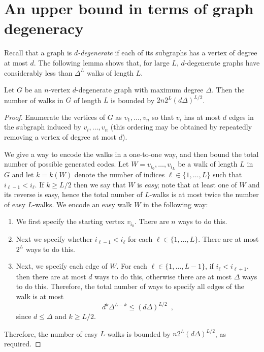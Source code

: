 \documentclass{patmorin}
\begin{document}
\section{An upper bound in terms of graph degeneracy}
Recall that a graph is \emph{$d$-degenerate} if each of its subgraphs has a vertex of  degree at most $d$.  The following lemma shows that, for large $L$, $d$-degenerate graphs have considerably less than $\Delta^L$ walks of length $L$.

\begin{lem}
   Let $G$ be an $n$-vertex $d$-degenerate graph with maximum degree
   $\Delta$.  Then the number of walks in $G$ of length $L$ is bounded by    $2n2^{L}(d\Delta)^{L/2}$.  
\end{lem}

\begin{proof}
   Enumerate the vertices of $G$ as $v_1,\ldots,v_n$ so that $v_i$ has at most
   $d$ edges in the subgraph induced by $v_i,\ldots,v_n$ (this ordering may be obtained by repeatedly removing a vertex of degree at most $d$).

   We give a way to encode the walks in a one-to-one way, and then bound the total number of possible generated codes.
   Let $W=v_{i_0},\ldots,v_{i_L}$
   be a walk of length $L$ in $G$ and let $k=k(W)$ denote the number
   of indices $\ell\in\{1,\ldots,L\}$ such that $i_{\ell-1} < i_{\ell}$.
   If $k\ge L/2$ then we say that $W$ is \emph{easy};
   note that at least one of $W$ and its reverse is easy, hence the total number of $L$-walks is at most twice the number of easy $L$-walks. We  encode an easy walk $W$ in the following way:
   \begin{enumerate}
     \item We first specify the starting vertex $v_{i_0}$.  There are $n$
       ways to do this.
     \item Next we specify whether $i_{\ell-1} < i_{\ell}$ for each
       $\ell\in\{1,\ldots,L\}$.  There are at most  $2^L$ ways to do this.
     \item Next, we specify each edge of $W$.  For each
       $\ell\in\{1,\ldots,L-1\}$, if $i_{\ell} < i_{\ell+1}$, then
       there are at most $d$ ways to do this, otherwise there are at
       most $\Delta$ ways to do this.
       Therefore, the total number of ways to specify all edges of the
       walk is at most
       \[   d^k\Delta^{L-k} \le (d\Delta)^{L/2}  \enspace ,\]
       since $d\le \Delta$ and $k\ge L/2$.
   \end{enumerate}
   Therefore, the number of easy $L$-walks is bounded by $n2^L(d\Delta)^{L/2}$, as required. \end{proof} 
\end{document}
